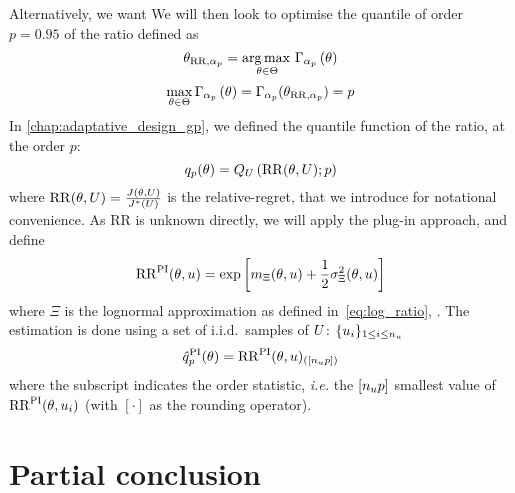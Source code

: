 \documentclass[../../Main_ManuscritThese.tex]{subfiles}
\newcommand\imgpath{/home/victor/acadwriting/Manuscrit/Text/Chapter5/img/}
\begin{document}
Alternatively, we want 
We will then look to optimise the quantile of order $p=0.95$ of the ratio defined as
\begin{equation}
  {\theta}_{\mathrm{RR},\alpha_p} = \operatorname*{arg\,max \,}_{\theta \in \Theta} \Gamma_{\alpha_p}\left(\theta\right)
\end{equation}
\begin{equation}
\max_{\theta\in\Theta}  \Gamma_{\alpha_p}\left(\theta\right) = \Gamma_{\alpha_p}(\theta_{\mathrm{RR}, \alpha_p}) = p
\end{equation}
In \cref{chap:adaptative_design_gp}, we defined the quantile function of the ratio, at the order $p$:
\begin{equation}
  q_p(\theta) = Q_{U}\left(\mathrm{RR}(\theta, U);p \right)
\end{equation}
where $\mathrm{RR}(\theta, U)=\frac{J(\theta, U)}{J^*(U)}$ is the
relative-regret, that we introduce for notational convenience.
As $\mathrm{RR}$ is unknown directly, we will apply the plug-in approach, and define
\begin{equation}
  \mathrm{RR}^{\mathrm{PI}}(\theta, u) = \exp\left[m_{\Xi}(\theta, u) + \frac{1}{2}\sigma^2_{\Xi}(\theta, u)\right]
\end{equation}
where $\Xi$ is the lognormal approximation as defined in~\cref{eq:log_ratio}, . The estimation is done using a set of i.i.d.\ samples of $U$: $\{u_i\}_{1\leq i \leq n_{u}}$
\begin{equation}
  \hat{q}_p^{\mathrm{PI}}(\theta) = {\mathrm{RR}}^{\mathrm{PI}}(\theta, u)_{(\left[n_{u}p\right])}
\end{equation}
where the subscript indicates the order statistic, \emph{i.e.} the $\left[n_{u}p\right]$ smallest value of $\mathrm{RR}^\mathrm{PI}(\theta,u_i)$ (with $[\cdot]$ as the rounding operator).

\section{Partial conclusion}

%   

%   


\vfill
\etoile
\vfill




\subfileLocal{
	\pagestyle{empty}
	
	
}
\end{document}
